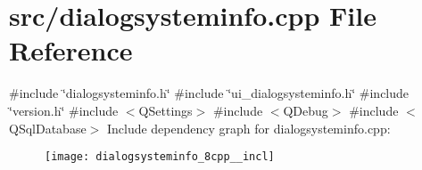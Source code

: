 \section{src/dialogsysteminfo.cpp File Reference}
\label{dialogsysteminfo_8cpp}
{\ttfamily \#include \char`\"{}dialogsysteminfo.\+h\char`\"{}}\newline
{\ttfamily \#include \char`\"{}ui\+\_\+dialogsysteminfo.\+h\char`\"{}}\newline
{\ttfamily \#include \char`\"{}version.\+h\char`\"{}}\newline
{\ttfamily \#include $<$Q\+Settings$>$}\newline
{\ttfamily \#include $<$Q\+Debug$>$}\newline
{\ttfamily \#include $<$Q\+Sql\+Database$>$}\newline
Include dependency graph for dialogsysteminfo.\+cpp\+:\nopagebreak
\begin{figure}[H]
\begin{center}
\leavevmode
\texttt{[image: dialogsysteminfo\_8cpp\_\_incl]}
\end{center}
\end{figure}
